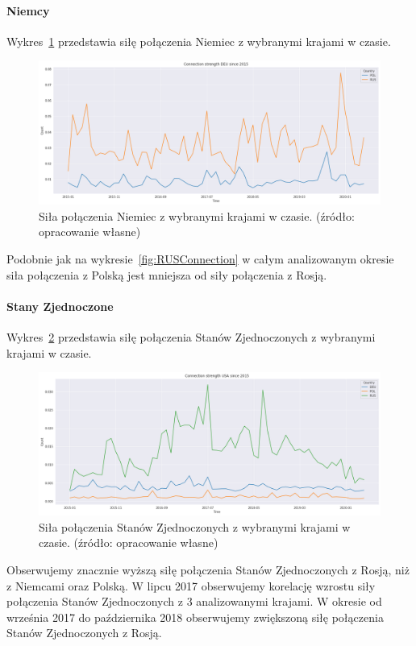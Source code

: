 \documentclass[11pt]{report}
\begin{document}
    \paragraph{Niemcy}

    Wykres~\ref{fig:DEUConnection} przedstawia siłę połączenia Niemiec z wybranymi krajami w czasie.
    \begin{figure}[!htp]
        \centering
        \includegraphics[width=\linewidth]{fig/DEU/DEUConnection.png}
        \caption{Siła połączenia Niemiec z wybranymi krajami w czasie. (źródło: opracowanie własne)}
        \label{fig:DEUConnection}
    \end{figure}
    Podobnie jak na wykresie~\ref{fig:RUSConnection} w całym analizowanym okresie siła połączenia z Polską jest mniejsza od siły połączenia z Rosją.

    \paragraph{Stany Zjednoczone}

    Wykres~\ref{fig:USAConnection} przedstawia siłę połączenia Stanów Zjednoczonych z wybranymi krajami w czasie.

    \begin{figure}[!htp]
        \centering
        \includegraphics[width=\linewidth]{fig/USA/USAConnection.png}
        \caption{Siła połączenia Stanów Zjednoczonych z wybranymi krajami w czasie. (źródło: opracowanie własne)}
        \label{fig:USAConnection}
    \end{figure}
    Obserwujemy znacznie wyższą siłę połączenia Stanów Zjednoczonych z Rosją, niż z Niemcami oraz Polską.
    W lipcu 2017 obserwujemy korelację wzrostu siły połączenia Stanów Zjednoczonych z 3 analizowanymi krajami.
    W okresie od września 2017 do października 2018 obserwujemy zwiększoną siłę połączenia Stanów Zjednoczonych z Rosją.
\end{document}
